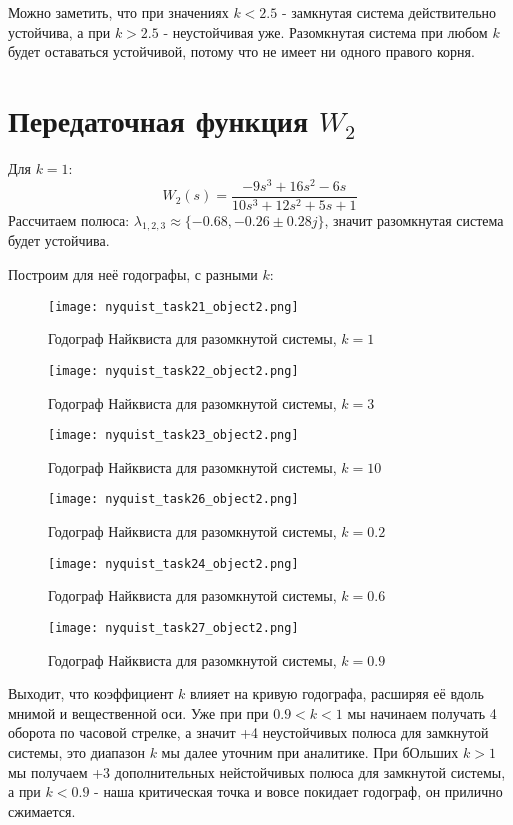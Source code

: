 Можно заметить, что при значениях $k < 2.5$ - замкнутая система действительно устойчива, а при $k > 2.5$ - неустойчивая уже.
Разомкнутая система при любом $k$ будет оставаться устойчивой, потому что не имеет ни одного правого корня.

\newpage
\section{Передаточная функция $W_2$}
Для $k=1$:
$$
W_2(s) = \frac{-9s^3+16s^2-6s}{10s^3+12s^2+5s+1}
$$
Рассчитаем полюса: $\lambda_{1,2,3} \approx \{-0.68, -0.26\pm 0.28j \}$, значит разомкнутая система будет устойчива. 

\newpage
Построим для неё годографы, с разными $k$:
\begin{figure}[ht]
    \centering
    \texttt{[image: nyquist\_task21\_object2.png]}
    \caption{Годограф Найквиста для разомкнутой системы, $k=1$}
\end{figure}
\begin{figure}[ht]
    \centering
    \texttt{[image: nyquist\_task22\_object2.png]}
    \caption{Годограф Найквиста для разомкнутой системы, $k=3$}
\end{figure}
\newpage
\begin{figure}[ht]
    \centering
    \texttt{[image: nyquist\_task23\_object2.png]}
    \caption{Годограф Найквиста для разомкнутой системы, $k=10$}
\end{figure}
\begin{figure}[ht]
    \centering
    \texttt{[image: nyquist\_task26\_object2.png]}
    \caption{Годограф Найквиста для разомкнутой системы, $k=0.2$}
\end{figure}
\newpage
\begin{figure}[ht]
    \centering
    \texttt{[image: nyquist\_task24\_object2.png]}
    \caption{Годограф Найквиста для разомкнутой системы, $k=0.6$}
\end{figure}
\begin{figure}[ht]
    \centering
    \texttt{[image: nyquist\_task27\_object2.png]}
    \caption{Годограф Найквиста для разомкнутой системы, $k=0.9$}
\end{figure}

Выходит, что коэффициент $k$ влияет на кривую годографа, расширяя её вдоль мнимой и вещественной оси. Уже при при $0.9 < k < 1$ мы начинаем получать 4 оборота по часовой стрелке, а значит +4 неустойчивых полюса для замкнутой системы, это  диапазон $k$  мы далее уточним при аналитике.
При бОльших $k > 1$ мы получаем +3 дополнительных нейстойчивых полюса для замкнутой системы, а при $k < 0.9$  - наша критическая точка и вовсе покидает годограф, он прилично сжимается. 

